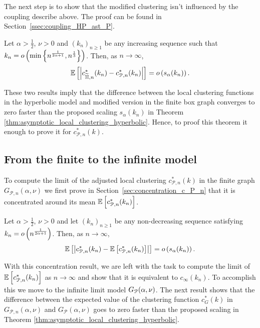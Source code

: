 The next step is to show that the modified clustering isn't influenced by the coupling describe above. The proof can be found in Section~\ref{ssec:coupling_HP_ast_P}.

\begin{proposition}\label{prop:couling_c_H_P}
Let $\alpha > \frac{1}{2}$, $\nu > 0$ and $(k_n)_{n\ge 1}$ be any increasing sequence such that $k_n = o\left(\min\left\{n^{\frac{1}{2\alpha + 1}}, n^{\frac{1}{3}}\right\}\right)$. Then, as $n \to \infty$,
\[
	\mathbb{E}\left[\left|c_{\widetilde{\mathbb{H}},n}^\ast(k_n) - c_{{\mathcal P},n}^\ast(k_n)\right|\right] = o\left(s_\alpha(k_n)\right).
\]
\end{proposition}

These two results imply that the difference between the local clustering functions in the hyperbolic model and modified version in the finite box graph converges to zero faster than the proposed scaling $s_\alpha(k_n)$ in Theorem \ref{thm:asymptotic_local_clustering_hyperbolic}. Hence, to proof this theorem it enough to prove it for $c_{\mathcal{P},n}^\ast(k)$. 

\subsection{From the finite to the infinite model}

To compute the limit of the adjusted local clustering $c_{\mathcal{P},n}^\ast(k)$ in the finite graph $G_{\mathcal{P},n}(\alpha, \nu)$ we first prove in Section~\ref{sec:concentration_c_P_n} that it is concentrated around its mean $\mathbb{E}\left[c_{\mathcal{P},n}^\ast(k_n)\right]$.

\begin{proposition}\label{prop:concentration_local_clustering_P_n}
Let $\alpha > \frac{1}{2}$, $\nu > 0$ and let $(k_n)_{n \ge 1}$ be any non-decreasing sequence satisfying $k_n = o\left(n^{\frac{1}{2\alpha+1}}\right)$. Then, as $n \to \infty$,
\[
	\mathbb{E}\left[\left|c_{\mathcal{P},n}^\ast(k_n) - \mathbb{E}\left[c_{\mathcal{P},n}^\ast(k_n)\right]\right|\right] = o\left(s_\alpha(k_n)\right).
\]
\end{proposition}

With this concentration result, we are left with the task to compute the limit of $\mathbb{E}\left[c_{\mathcal{P},n}^\ast(k_n)\right]$ as $n \to \infty$ and show that it is equivalent to $c_\infty(k_n)$. To accomplish this we move to the infinite limit model $G_{{\mathcal P}}(\alpha,\nu)$. The next result shows that the difference between the expected value of the clustering function $c_G^\ast(k)$ in $G_{\mathcal{P},n}(\alpha,\nu)$ and $G_{\mathcal{P}}(\alpha,\nu)$ goes to zero faster than the proposed scaling in Theorem \ref{thm:asymptotic_local_clustering_hyperbolic}.


